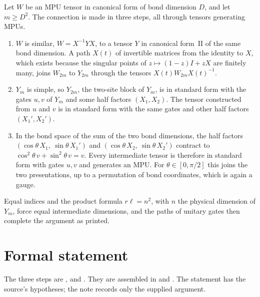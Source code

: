 \documentclass{article}
\begin{document}
Let $W$ be an MPU tensor in canonical form of bond dimension $D$, and let
$m\geq D^2$. The connection is made in three steps, all through tensors
generating MPUs.
\begin{enumerate}
    \item $W$ is similar, $W=X^{-1}YX$, to a tensor $Y$ in canonical form~II
          of the same bond dimension. A path $X(t)$ of invertible matrices from
          the identity to $X$, which exists because the singular points of
          $z\mapsto(1-z)I+zX$ are finitely many, joins $W_{2m}$ to $Y_{2m}$
          through the tensors $X(t)W_{2m}X(t)^{-1}$.
    \item $Y_m$ is simple, so $Y_{2m}$, the two-site block of $Y_m$, is in
          standard form with the gates $u,v$ of $Y_m$ and some half factors
          $(X_1,X_2)$. The tensor constructed from $u$ and $v$ is in standard
          form with the same gates and other half factors $(X_1',X_2')$.
    \item In the bond space of the sum of the two bond dimensions, the half
          factors $(\cos\theta\,X_1,\ \sin\theta\,X_1')$ and
          $(\cos\theta\,X_2,\ \sin\theta\,X_2')$ contract to
          $\cos^2\theta\,v+\sin^2\theta\,v=v$. Every intermediate tensor is
          therefore in standard form with gates $u,v$ and generates an MPU.
          For $\theta\in[0,\pi/2]$ this joins the two presentations, up to a
          permutation of bond coordinates, which is again a gauge.
\end{enumerate}
Equal indices and the product formula $r\ell=n^2$, with $n$ the physical
dimension of $Y_m$, force equal intermediate dimensions, and the paths of
unitary gates then complete the argument as printed.

\section{Formal statement}

The three steps are ,
 and
. They are assembled in
 and
. The statement has the
source's hypotheses; the note records only the supplied argument.



\end{document}
